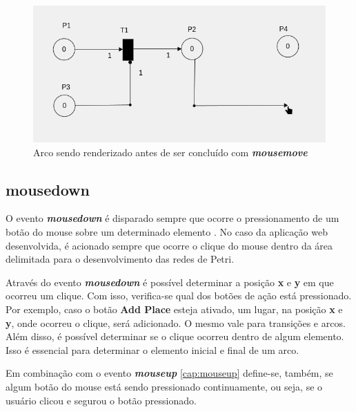 \documentclass[
	12pt,				%
	openright,			%
	oneside,			%
	a4paper,			%
	english,			%
	brazil				%
	]{abntex2}
\begin{document}
\begin{figure}[ht] 
	\centering
	\includegraphics[scale=0.4]{figuras/mousemove_desenhando_arco.png}
	\caption[Mousemove desenhando arco]{Arco sendo renderizado antes de ser concluído com \textbf{\textit{mousemove}}}
	\label{fig:mousemove_desenhando_arco}
\end{figure}

\subsection*{mousedown}\label{cap:mousedown}

O evento \textbf{\textit{mousedown}} é disparado sempre que ocorre o pressionamento de um botão do mouse sobre um determinado elemento \cite{mdn_mousedown_event}. No caso da aplicação web desenvolvida, é acionado sempre que ocorre o clique do mouse dentro da área delimitada para o desenvolvimento das redes de Petri. 



Através do evento \textbf{\textit{mousedown}} é possível determinar a posição \textbf{x} e \textbf{y} em que ocorreu um clique. Com isso, verifica-se qual dos botões de ação está pressionado. Por exemplo, caso o botão \textbf{Add Place} esteja ativado, um lugar, na posição \textbf{x} e \textbf{y}, onde ocorreu o clique, será adicionado. O mesmo vale para transições e arcos. Além disso, é possível determinar se o clique ocorreu dentro de algum elemento. Isso é essencial para determinar o elemento inicial e final de um arco. 

Em combinação com o evento \textbf{\textit{mouseup}} \ref{cap:mouseup} define-se, também, se algum botão do mouse está sendo pressionado continuamente, ou seja, se o usuário clicou e segurou o botão pressionado. 
\end{document}
